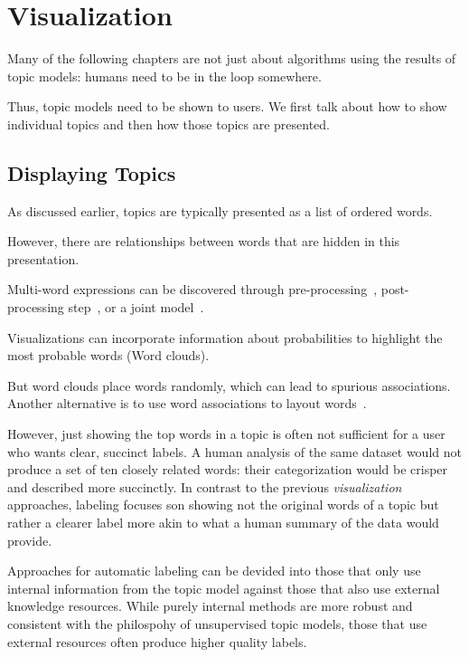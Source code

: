 

\chapter{Visualization}
\label{ch:viz}

Many of the following chapters are not just about algorithms using the
results of topic models: humans need to be in the loop somewhere.

Thus, topic models need to be shown to users.  We first talk about how
to show individual topics and then how those topics are presented.

\section{Displaying Topics}

As discussed earlier, topics are typically presented as a list of
ordered words.

However, there are relationships between words that are hidden in this
presentation.

Multi-word expressions can be discovered through
pre-processing~\citep{talley-11}, post-processing step~\citep{blei-09b},
or a joint model~\citep{johnson-10}.

Visualizations can incorporate information about probabilities to
highlight the most probable words (Word clouds).

But word clouds place words randomly, which can lead to spurious
associations.  Another alternative is to use word associations to
layout words~\citep{Smith:Chuang:Hu:Boyd-Graber:Findlater-2014}.



However, just showing the top words in a topic is often not sufficient
for a user who wants clear, succinct labels.  A human analysis of the
same dataset would not produce a set of ten closely related words:
their categorization would be crisper and described more succinctly.
In contrast to the previous \emph{visualization} approaches, labeling
focuses son showing not the original words of a topic but rather a
clearer label more akin to what a human summary of the data would
provide.

Approaches for automatic labeling can be devided into those that only
use internal information from the topic model against those that also
use external knowledge resources.  While purely internal methods are
more robust and consistent with the philospohy of unsupervised topic
models, those that use external resources often produce higher quality
labels.

